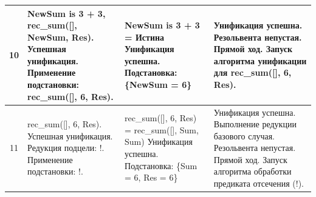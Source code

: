 \begin{tabularx}{\textwidth}{|c|>{\small}X|>{\small}X|>{\small}X|}
	10                                                                                 &
	NewSum is 3 + 3, \newline
	rec\_sum([], NewSum, Res). \newline
	Успешная унификация. \newline
	Применение подстановки: \newline
	rec\_sum([], 6, Res).                                                              &
	NewSum is 3 + 3 = \newline
	Истина \newline
	Унификация успешна. \newline
	Подстановка: \newline
	\{NewSum = 6\}                                                                     &
	Унификация успешна. \newline
	Резольвента непустая. \newline
	Прямой ход. \newline
	Запуск алгоритма унификации для rec\_sum([], 6, Res).                                \\
	\hline

	11                                                                                 &
	rec\_sum([], 6, Res). \newline
	Успешная унификация. \newline
	Редукция подцели: \newline
	!. \newline
	Применение подстановки: \newline
	!.                                                                                 &
	rec\_sum([], 6, Res) = \newline
	rec\_sum([], Sum, Sum) \newline
	Унификация успешна. \newline
	Подстановка: \newline
	\{Sum = 6, Res = 6\}                                                               &
	Унификация успешна. \newline
	Выполнение редукции базового случая. \newline
	Резольвента непустая. \newline
	Прямой ход. \newline
	Запуск алгоритма обработки предиката отсечения (!).                                  \\
	\hline


\end{tabularx}
